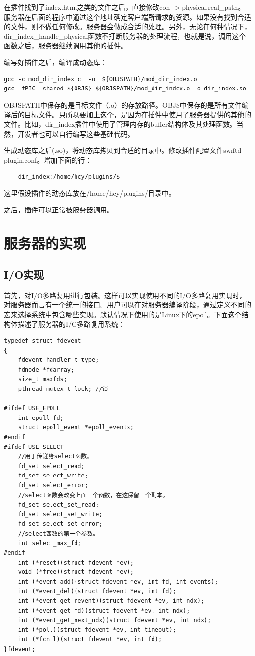 \documentclass[twoside, xetex]{report}
\begin{document}
	在插件找到了index.html之类的文件之后，直接修改con -> physical.real\_path。服务器在后面的程序中通过这个地址确定客户端所请求的资源。如果没有找到合适的文件，则不做任何修改。服务器会做成合适的处理。另外，无论在何种情况下，dir\_index\_handle\_physical函数不打断服务器的处理流程，也就是说，调用这个函数之后，服务器继续调用其他的插件。
	
	编写好插件之后，编译成动态库：
\begin{verbatim}
gcc -c mod_dir_index.c  -o  ${OBJSPATH}/mod_dir_index.o
gcc -fPIC -shared ${OBJS} ${OBJSPATH}/mod_dir_index.o -o dir_index.so
\end{verbatim}

	OBJSPATH中保存的是目标文件（.o）的存放路径。OBJS中保存的是所有文件编译后的目标文件。只所以要加上这个，是因为在插件中使用了服务器提供的其他的文件。比如，dir\_index插件中使用了管理内存的buffer结构体及其处理函数。当然，开发者也可以自行编写这些基础代码。
	
	生成动态库之后(.so)，将动态库拷贝到合适的目录中。修改插件配置文件swiftd-plugin.conf。增加下面的行：
\begin{verbatim}
	dir_index:/home/hcy/plugins/$
\end{verbatim}

	这里假设插件的动态库放在/home/hcy/plugins/目录中。
	
	之后，插件可以正常被服务器调用。
	
\section{服务器的实现}

\subsection{I/O实现}
	首先，对I/O多路复用进行包装。这样可以实现使用不同的I/O多路复用实现时，对服务器而言有一个统一的接口。用户可以在对服务器编译阶段，通过定义不同的宏来选择系统中包含哪些实现。默认情况下使用的是Linux下的epoll。下面这个结构体描述了服务器的I/O多路复用系统：
\begin{verbatim}	
typedef struct fdevent
{
	fdevent_handler_t type;
	fdnode *fdarray;
	size_t maxfds;
	pthread_mutex_t lock; //锁

#ifdef USE_EPOLL
	int epoll_fd;
	struct epoll_event *epoll_events;
#endif
#ifdef USE_SELECT
	//用于传递给select函数。
	fd_set select_read;
	fd_set select_write;
	fd_set select_error;
	//select函数会改变上面三个函数，在这保留一个副本。
	fd_set select_set_read;
	fd_set select_set_write;
	fd_set select_set_error;
	//select函数的第一个参数。
	int select_max_fd;
#endif
	int (*reset)(struct fdevent *ev);
	void (*free)(struct fdevent *ev);
	int (*event_add)(struct fdevent *ev, int fd, int events);
	int (*event_del)(struct fdevent *ev, int fd);
	int (*event_get_revent)(struct fdevent *ev, int ndx);
	int (*event_get_fd)(struct fdevent *ev, int ndx);
	int (*event_get_next_ndx)(struct fdevent *ev, int ndx);
	int (*poll)(struct fdevent *ev, int timeout);
	int (*fcntl)(struct fdevent *ev, int fd);
}fdevent;
\end{verbatim}
\end{document}
